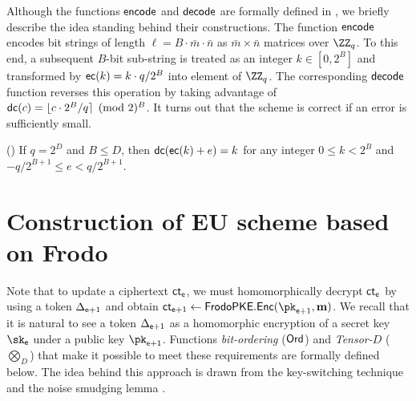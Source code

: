 \documentclass{fundam}
\begin{document}
 \vspace{0.5cm}
Although the functions $\mathsf{encode}$ and $\mathsf{decode}$ are formally defined in \cite{Frodo,Frodo2}, we briefly describe the idea standing behind their constructions. The function $\mathsf{encode}$ encodes bit strings of length $\ell = B\cdot\bar{m}\cdot\bar{n}$ as $\bar{m}\times\bar{n}$ matrices over $\ZZ_{q}$. To this end, a subsequent $B$-bit sub-string is treated as an integer $k\in[0,2^{B}]$ and transformed by $\mathsf{ec}(k)=k\cdot q/2^{B}$ into element of $\ZZ_{q}$. The corresponding $\mathsf{decode}$ function reverses this operation by taking advantage of $\mathsf{dc}(c)=\lfloor c\cdot 2^{B}/q\rceil \pmod 2^{B}$. 
It turns out that the scheme is correct if an error is sufficiently small.
\begin{lemma}(\cite{Frodo})\label{lem::01}
If $q=2^{D}$ and $B\leq D$, then $\mathsf{dc}(\mathsf{ec}(k)+e)=k$ for any integer $0\leq k < 2^{B}$ and $-q/2^{B+1}\leq e < q/2^{B+1}$. 	
\end{lemma}	


\section{Construction of  EU scheme based on Frodo}
Note that to update a ciphertext $\mathsf{ct}_{\mathsf{e}}$, we must homomorphically decrypt $\mathsf{ct}_{\mathsf{e}}$ by using a token $\Delta_{\mathsf{e}+1}$ and obtain $\ct_{\epoch+1}\gets \tx{FrodoPKE.Enc}(\pk_{\epoch+1}, \m)$.
We recall that it is natural to see a token $\Delta_{\mathsf{e}+1}$ as a homomorphic encryption of a secret key $\sk_{\epoch}$ under a public key $\pk_{\epoch+1}$. Functions \textit{bit-ordering} ($\mathsf{Ord}$) and \textit{Tensor-$D$} ($\bigotimes_{D}$) that make it possible to meet these requirements are formally defined below. The idea behind this approach is drawn from the key-switching technique \cite{brakerski2014efficient,brakerski2014leveled,brakerski2011fully} and the noise smudging lemma \cite{asharov2012multiparty, nishimaki2022direction}.
\end{document}
